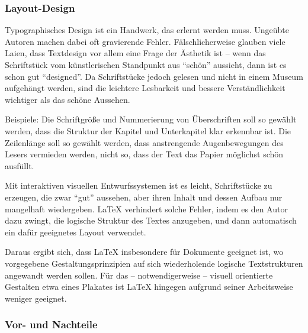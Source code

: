  
\subsubsection{Layout-Design}
 
Typographisches Design ist ein Handwerk, das erlernt werden muss.
Ungeübte Autoren machen dabei oft gravierende Fehler.
Fälschlicherweise glauben viele Laien, dass Textdesign
vor allem eine Frage der Ästhetik ist -- wenn das
Schriftstück vom künstlerischen Standpunkt aus "`schön"'
aussieht, dann ist es schon gut "`designed"'.
Da Schriftstücke jedoch gelesen und nicht in einem Museum
aufgehängt werden, sind die leichtere Lesbarkeit und bessere
Verständlichkeit wichtiger als das schöne Aussehen.
 
Beispiele:
Die Schriftgröße und Nummerierung von Überschriften soll so
gewählt werden, dass die Struktur der Kapitel und Unterkapitel
klar erkennbar ist.
Die Zeilenlänge soll so gewählt werden, dass anstrengende
Augenbewegungen des Lesers vermieden werden, nicht so, dass der
Text das Papier möglichst schön ausfüllt.
 
Mit interaktiven visuellen Entwurfssystemen ist es leicht,  
Schriftstücke zu erzeugen, die zwar "`gut"' aussehen,
aber ihren Inhalt und dessen Aufbau nur mangelhaft wiedergeben.
\LaTeX{} verhindert solche
Fehler, indem es den Autor dazu zwingt, die logische
Struktur des Textes anzugeben, und dann automatisch ein dafür
geeignetes Layout verwendet.

Daraus ergibt sich, dass \LaTeX{} insbesondere für  Dokumente geeignet 
ist, wo vorgegebene Gestaltungsprinzipien auf sich wiederholende
logische Textstrukturen angewandt werden sollen. 
Für das -- notwendigerweise -- visuell orientierte Gestalten
etwa eines Plakates ist \LaTeX{} hingegen 
aufgrund seiner Arbeitsweise weniger geeignet.

\subsubsection{Vor- und Nachteile}

